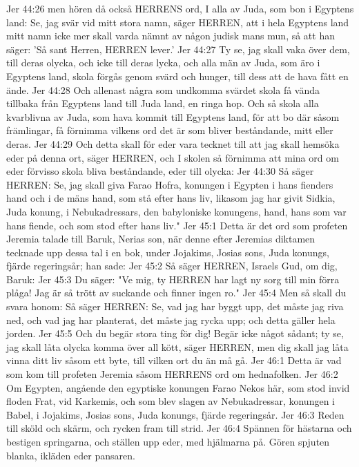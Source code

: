 Jer 44:26  men hören då också HERRENS ord, I alla av Juda, som bon i Egyptens land: Se, jag svär vid mitt stora namn, säger HERREN, att i hela Egyptens land mitt namn icke mer skall varda nämnt av någon judisk mans mun, så att han säger: 'Så sant Herren, HERREN lever.'
Jer 44:27  Ty se, jag skall vaka över dem, till deras olycka, och icke till deras lycka, och alla män av Juda, som äro i Egyptens land, skola förgås genom svärd och hunger, till dess att de hava fått en ände.
Jer 44:28  Och allenast några som undkomma svärdet skola få vända tillbaka från Egyptens land till Juda land, en ringa hop. Och så skola alla kvarblivna av Juda, som hava kommit till Egyptens land, för att bo där såsom främlingar, få förnimma vilkens ord det är som bliver beståndande, mitt eller deras.
Jer 44:29  Och detta skall för eder vara tecknet till att jag skall hemsöka eder på denna ort, säger HERREN, och I skolen så förnimma att mina ord om eder förvisso skola bliva beståndande, eder till olycka:
Jer 44:30  Så säger HERREN: Se, jag skall giva Farao Hofra, konungen i Egypten i hans fienders hand och i de mäns hand, som stå efter hans liv, likasom jag har givit Sidkia, Juda konung, i Nebukadressars, den babyloniske konungens, hand, hans som var hans fiende, och som stod efter hans liv."
Jer 45:1  Detta är det ord som profeten Jeremia talade till Baruk, Nerias son, när denne efter Jeremias diktamen tecknade upp dessa tal i en bok, under Jojakims, Josias sons, Juda konungs, fjärde regeringsår; han sade:
Jer 45:2  Så säger HERREN, Israels Gud, om dig, Baruk:
Jer 45:3  Du säger: "Ve mig, ty HERREN har lagt ny sorg till min förra plåga! Jag är så trött av suckande och finner ingen ro."
Jer 45:4  Men så skall du svara honom: Så säger HERREN: Se, vad jag har byggt upp, det måste jag riva ned, och vad jag har planterat, det måste jag rycka upp; och detta gäller hela jorden.
Jer 45:5  Och du begär stora ting för dig! Begär icke något sådant; ty se, jag skall låta olycka komma över all kött, säger HERREN, men dig skall jag låta vinna ditt liv såsom ett byte, till vilken ort du än må gå.
Jer 46:1  Detta är vad som kom till profeten Jeremia såsom HERRENS ord om hednafolken.
Jer 46:2  Om Egypten, angående den egyptiske konungen Farao Nekos här, som stod invid floden Frat, vid Karkemis, och som blev slagen av Nebukadressar, konungen i Babel, i Jojakims, Josias sons, Juda konungs, fjärde regeringsår.
Jer 46:3  Reden till sköld och skärm, och rycken fram till strid.
Jer 46:4  Spännen för hästarna och bestigen springarna, och ställen upp eder, med hjälmarna på. Gören spjuten blanka, ikläden eder pansaren.
